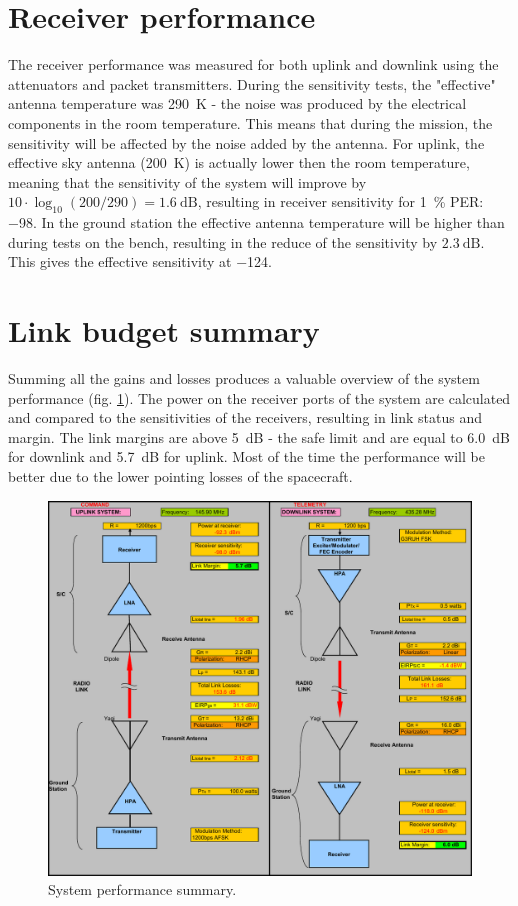 \section{Receiver performance}
The receiver performance was measured for both uplink and downlink using the attenuators and packet transmitters. During the sensitivity tests, the "effective" antenna temperature was \SI{290}{\kelvin} - the noise was produced by the electrical components in the room temperature. This means that during the mission, the sensitivity will be affected by the noise added by the antenna.
For uplink, the effective sky antenna (\SI{200}{\kelvin}) is actually lower then the room temperature, meaning that the sensitivity of the system will improve by $10\cdot \log_{10}(200/290) = \SI{1.6}{\dB}$, resulting in receiver sensitivity for \SI{1}{\percent} PER: \SI{-98}{\dBm}.
In the ground station the effective antenna temperature will be higher than during tests on the bench, resulting in the reduce of the sensitivity by $\SI{2.3}{\dB}$. This gives the effective sensitivity at \SI{-124}{\dBm}.


\section{Link budget summary}
Summing all the gains and losses produces a valuable overview of the system performance (fig. \ref{link:link_status}). The power on the receiver ports of the system are calculated and compared to the sensitivities of the receivers, resulting in link status and margin. The link margins are above \SI{5}{\dB} - the safe limit and are equal to \SI{6.0}{\dB} for downlink and \SI{5.7}{\dB} for uplink. Most of the time the performance will be better due to the lower pointing losses of the spacecraft. 

\begin{figure}
    \centering
    \includegraphics[width=0.8\paperwidth]{img/6/link_summary.pdf}
    \caption{System performance summary.}
    \label{link:link_status}
\end{figure}